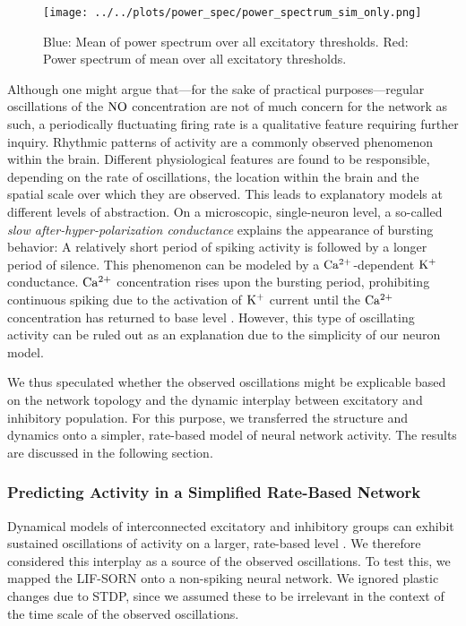 \documentclass[10pt,a4paper]{article}
\begin{document}
\begin{figure}
\begin{center}
\texttt{[image: ../../plots/power\_spec/power\_spectrum\_sim\_only.png]}
\caption[Power spectrum of thresholds of excitatory neurons]{Blue: Mean of power spectrum over all excitatory thresholds. Red: Power spectrum of mean over all excitatory thresholds.}
\label{Power_Spec_without_Analysis}
\end{center}
\end{figure}

Although one might argue that---for the sake of practical purposes---regular oscillations of the $\rm NO$ concentration are not of much concern for the network as such, a periodically fluctuating firing rate is a qualitative feature requiring further inquiry. Rhythmic patterns of activity are a commonly observed phenomenon within the brain. Different physiological features are found to be responsible, depending on the rate of oscillations, the location within the brain and the spatial scale over which they are observed. This leads to explanatory models at different levels of abstraction. On a microscopic, single-neuron level, a so-called \textit{slow after-hyper-polarization conductance} explains the appearance of bursting behavior: A relatively short period of spiking activity is followed by a longer period of silence. This phenomenon can be modeled by a $\rm Ca^{2+}$-dependent $\rm K^{+}$ conductance. $\rm Ca^{2+}$ concentration rises upon the bursting period, prohibiting continuous spiking due to the activation of $\rm K^{+}$  current until the $\rm Ca^{2+}$ concentration has returned to base level \cite[p.~203--207]{Theor_Neur_Dayan}. However, this type of oscillating activity can be ruled out as an explanation due to the simplicity of our neuron model.

We thus speculated whether the observed oscillations might be explicable based on the network topology and the dynamic interplay between excitatory and inhibitory population. For this purpose, we transferred the structure and dynamics onto a simpler, rate-based model of neural network activity. The results are discussed in the following section.

\subsubsection{Predicting Activity in a Simplified Rate-Based Network}
Dynamical models of interconnected excitatory and inhibitory groups can exhibit sustained oscillations of activity on a larger, rate-based level \cite[p.~270]{Theor_Neur_Dayan}. We therefore considered this interplay as a source of the observed oscillations. To test this, we mapped the LIF-SORN onto a non-spiking neural network. We ignored plastic changes due to STDP, since we assumed these to be irrelevant in the context of the time scale of the observed oscillations.
\end{document}
